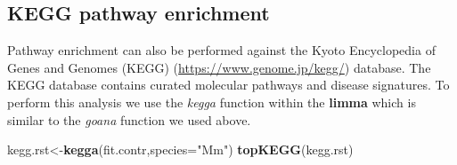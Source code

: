 \documentclass[]{book}
\newenvironment{Shaded}{\begin{snugshade}}{\end{snugshade}}
\newcommand{\DataTypeTok}[1]{\textcolor[rgb]{0.13,0.29,0.53}{#1}}
\newcommand{\KeywordTok}[1]{\textcolor[rgb]{0.13,0.29,0.53}{\textbf{#1}}}
\newcommand{\NormalTok}[1]{#1}
\newcommand{\StringTok}[1]{\textcolor[rgb]{0.31,0.60,0.02}{#1}}
\begin{document}
\hypertarget{kegg-pathway-enrichment}{%
\subsection{KEGG pathway enrichment}\label{kegg-pathway-enrichment}}

Pathway enrichment can also be performed against the Kyoto Encyclopedia of Genes and Genomes (KEGG) (\url{https://www.genome.jp/kegg/}) database. The KEGG database contains curated molecular pathways and disease signatures. To perform this analysis we use the \emph{kegga} function within the \textbf{limma} which is similar to the \emph{goana} function we used above.

\begin{Shaded}
\begin{Highlighting}[]
\NormalTok{kegg.rst<-}\KeywordTok{kegga}\NormalTok{(fit.contr,}\DataTypeTok{species=}\StringTok{"Mm"}\NormalTok{)}
\KeywordTok{topKEGG}\NormalTok{(kegg.rst)}
\end{Highlighting}
\end{Shaded}
\end{document}
